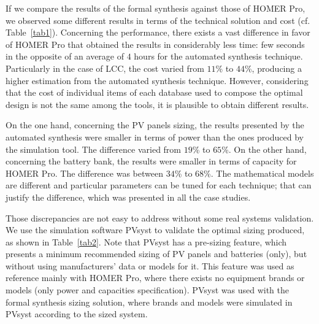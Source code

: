 \documentclass[journal]{IEEEtran}
\begin{document}
%
If we compare the results of the formal synthesis against those of HOMER Pro, we observed some different results in terms of the technical solution and cost (cf. Table~\ref{tab1}). Concerning the performance, there exists a vast difference in favor of HOMER Pro that obtained the results in considerably less time: few seconds in the opposite of an average of $4$ hours for the automated synthesis technique.
%
Particularly in the case of LCC, the cost varied from $11$\% to $44$\%, producing a higher estimation from the automated synthesis technique. However, considering that the cost of individual items of each database used to compose the optimal design is not the same among the tools, it is plausible to obtain different results.

On the one hand, concerning the PV panels sizing, the results presented by the automated synthesis were smaller in terms of power than the ones produced by the simulation tool. The difference varied from $19$\% to $65$\%. On the other hand, concerning the battery bank, the results were smaller in terms of capacity for HOMER Pro. The difference was between $34$\% to $68$\%. The mathematical models are different and particular parameters can be tuned for each technique; that can justify the difference, which was presented in all the case studies.

Those discrepancies are not easy to address without some real systems validation. We use the simulation software PVsyst to validate the optimal sizing produced, as shown in Table~\ref{tab2}. Note that PVsyst has a pre-sizing feature, which presents a minimum recommended sizing of PV panels and batteries (only), but without using manufacturers' data or models for it. This feature was used as reference mainly with HOMER Pro, where there exists no equipment brands or models (only power and capacities specification). PVsyst was used with the formal synthesis sizing solution, where brands and models were simulated in PVsyst according to the sized system.
\end{document}
